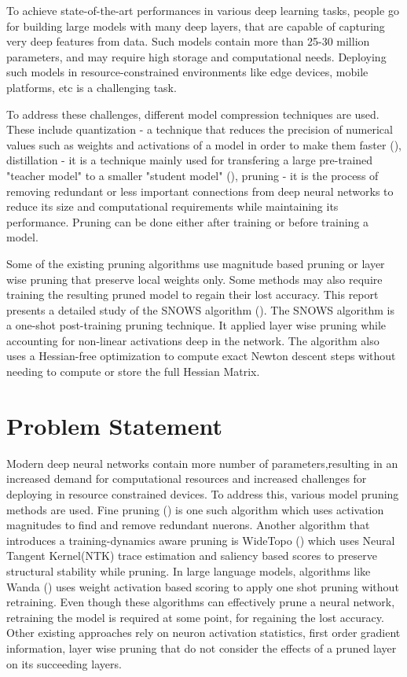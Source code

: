 \documentclass[11pt]{extreport}
\begin{document}
		To achieve state-of-the-art performances in various deep learning tasks, people go for building large models with many deep layers, that are capable of capturing very deep features from data. Such models contain more than 25-30 million parameters, and may require high storage and computational needs. Deploying such models in resource-constrained environments like edge devices, mobile platforms, etc is a challenging task.
		
		To address these challenges, different model compression techniques are used. These include quantization - a technique that reduces the precision of numerical values such as weights and activations of a model in order to make them faster (\cite{web_01}), distillation - it is a technique mainly used for transfering a large pre-trained "teacher model" to a smaller "student model" (\cite{web_02}), pruning - it is the process of removing redundant or less important connections from deep neural networks to reduce its size and computational requirements while maintaining its performance. Pruning can be done either after training or before training a model. 

		Some of the existing pruning algorithms use magnitude based pruning or layer wise pruning that preserve local weights only. Some methods may also require training the resulting pruned model to regain their lost accuracy. This report presents a detailed study of the SNOWS algorithm (\cite{lucas2025preserving}). The SNOWS algorithm is a one-shot post-training pruning technique. It applied layer wise pruning while accounting for non-linear activations deep in the network. The algorithm also uses a Hessian-free optimization to compute exact Newton descent steps without needing to compute or store the full Hessian Matrix.

	\newpage
	\chapter[Problem Statement]{Problem Statement}
		Modern deep neural networks contain more number of parameters,resulting in an increased demand for computational resources and increased challenges for deploying in resource constrained devices. To address this, various model pruning methods are used. Fine pruning (\cite{BINGHAM2025101242}) is one such algorithm which uses activation magnitudes to find and remove redundant nuerons. Another algorithm that introduces a training-dynamics aware pruning is WideTopo (\cite{DENG2026108136}) which uses Neural Tangent Kernel(NTK) trace estimation and saliency based scores to preserve structural stability while pruning. In large language models, algorithms like Wanda (\cite{wanda}) uses weight activation based scoring to apply one shot pruning without retraining. Even though these algorithms can effectively prune a neural network, retraining the model is required at some point, for regaining the lost accuracy. Other existing approaches rely on neuron activation statistics, first order gradient information, layer wise pruning that do not consider the effects of a pruned layer on its succeeding layers. 
		
\end{document}
